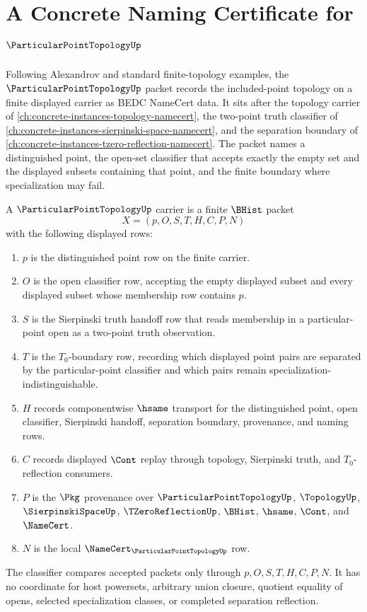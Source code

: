 \chapter{A Concrete Naming Certificate for $\ParticularPointTopologyUp$}
\label{ch:concrete-instances-particular-point-topology-namecert}

Following Alexandrov and standard finite-topology examples, the $\ParticularPointTopologyUp$ packet records the included-point topology on a finite displayed carrier as BEDC NameCert data. It sits after the topology carrier of \autoref{ch:concrete-instances-topology-namecert}, the two-point truth classifier of \autoref{ch:concrete-instances-sierpinski-space-namecert}, and the separation boundary of \autoref{ch:concrete-instances-tzero-reflection-namecert}. The packet names a distinguished point, the open-set classifier that accepts exactly the empty set and the displayed subsets containing that point, and the finite boundary where specialization may fail.

\begin{definition}
\label{def:particular-point-topology-carrier}
A $\ParticularPointTopologyUp$ carrier is a finite $\BHist$ packet
$$
X=(p,O,S,T,H,C,P,N)
$$
with the following displayed rows:
\begin{enumerate}
\item $p$ is the distinguished point row on the finite carrier.
\item $O$ is the open classifier row, accepting the empty displayed subset and every displayed subset whose membership row contains $p$.
\item $S$ is the Sierpinski truth handoff row that reads membership in a particular-point open as a two-point truth observation.
\item $T$ is the $T_0$-boundary row, recording which displayed point pairs are separated by the particular-point classifier and which pairs remain specialization-indistinguishable.
\item $H$ records componentwise $\hsame$ transport for the distinguished point, open classifier, Sierpinski handoff, separation boundary, provenance, and naming rows.
\item $C$ records displayed $\Cont$ replay through topology, Sierpinski truth, and $T_0$-reflection consumers.
\item $P$ is the $\Pkg$ provenance over $\ParticularPointTopologyUp$, $\TopologyUp$, $\SierpinskiSpaceUp$, $\TZeroReflectionUp$, $\BHist$, $\hsame$, $\Cont$, and $\NameCert$.
\item $N$ is the local $\NameCert_{\ParticularPointTopologyUp}$ row.
\end{enumerate}
The classifier compares accepted packets only through $p,O,S,T,H,C,P,N$. It has no coordinate for host powersets, arbitrary union closure, quotient equality of opens, selected specialization classes, or completed separation reflection.
\end{definition}

